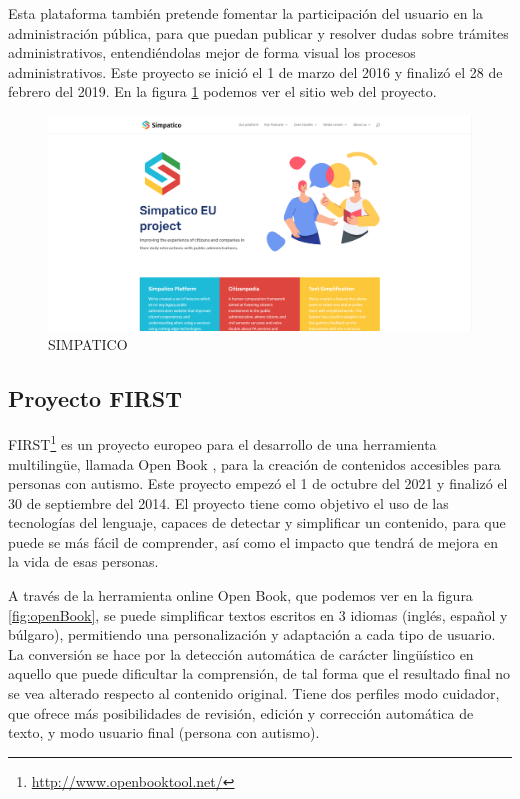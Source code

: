 Esta plataforma también pretende fomentar la participación del usuario en la administración pública, para que puedan publicar y resolver dudas sobre trámites administrativos, entendiéndolas mejor de forma visual los procesos administrativos. Este proyecto se inició el 1 de marzo del 2016 y finalizó el 28 de febrero del 2019. En la figura \ref{fig:simpatico} podemos ver el sitio web del proyecto.


\begin{figure}[h]
	\centering
	\includegraphics[width=1.0\textwidth]{Imagenes/ProyectosMateriales/simpatico}
	\caption{SIMPATICO}
	\label{fig:simpatico}
\end{figure} 


\newpage

\subsection{Proyecto FIRST }

FIRST\footnote{\href{http://www.openbooktool.net/}{http://www.openbooktool.net/}} es un proyecto europeo para el desarrollo de una herramienta multilingüe, llamada Open Book \citep{openBook}, para la creación de contenidos accesibles para personas con autismo. Este proyecto empezó el 1 de octubre del 2021 y finalizó el 30 de septiembre del 2014.
El proyecto tiene como objetivo el uso de las tecnologías del lenguaje, capaces de detectar y simplificar un contenido, para que puede se más fácil de comprender, así como el impacto que tendrá de mejora en la vida de esas personas. 

A través de la herramienta online Open Book, que podemos ver en la figura \ref{fig:openBook}, se puede simplificar textos escritos en 3 idiomas (inglés, español y búlgaro), permitiendo una personalización y adaptación a cada tipo de usuario. La conversión se hace por la detección automática de carácter lingüístico en aquello que puede dificultar la comprensión, de tal forma que el resultado final no se vea alterado respecto al contenido original. Tiene dos perfiles modo cuidador, que ofrece más posibilidades de revisión, edición y corrección automática de texto, y modo usuario final (persona con autismo). 


